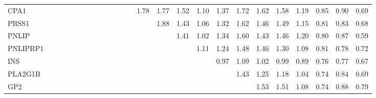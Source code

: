 \begin{longtable}{lrrrrrrrrrrrrrrrrrrrrrrrr}
CPA1     &              &              &              &             &             &             &             &            &              &            &            &            &        1.78 &        1.77 &           1.52 &      1.10 &          1.37 &      1.72 &        1.62 &        1.58 &       1.19 &       0.85 &        0.90 &        0.69 \\
PRSS1    &              &              &              &             &             &             &             &            &              &            &            &            &             &        1.88 &           1.43 &      1.06 &          1.32 &      1.62 &        1.46 &        1.49 &       1.15 &       0.81 &        0.83 &        0.68 \\
PNLIP    &              &              &              &             &             &             &             &            &              &            &            &            &             &             &           1.41 &      1.02 &          1.34 &      1.60 &        1.43 &        1.46 &       1.20 &       0.80 &        0.87 &        0.59 \\
PNLIPRP1 &              &              &              &             &             &             &             &            &              &            &            &            &             &             &                &      1.11 &          1.24 &      1.48 &        1.46 &        1.30 &       1.08 &       0.81 &        0.78 &        0.72 \\
INS      &              &              &              &             &             &             &             &            &              &            &            &            &             &             &                &           &          0.97 &      1.09 &        1.02 &        0.99 &       0.89 &       0.76 &        0.77 &        0.67 \\
PLA2G1B  &              &              &              &             &             &             &             &            &              &            &            &            &             &             &                &           &               &      1.43 &        1.25 &        1.18 &       1.04 &       0.74 &        0.84 &        0.69 \\
GP2      &              &              &              &             &             &             &             &            &              &            &            &            &             &             &                &           &               &           &        1.53 &        1.51 &       1.08 &       0.74 &        0.88 &        0.79 \\

\end{longtable}
